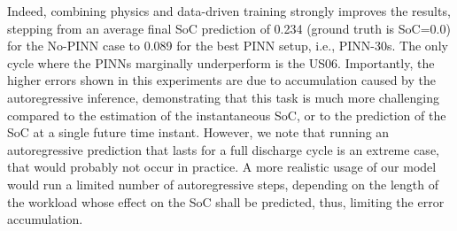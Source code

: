Indeed, combining physics and data-driven training strongly improves the results, stepping from an average final SoC prediction of 0.234 (ground truth is SoC=0.0) for the No-PINN case to 0.089 for the best PINN setup, i.e., PINN-30s. 
The only cycle where the PINNs marginally underperform is the US06.
Importantly, the higher errors shown in this experiments are due to accumulation caused by the autoregressive inference,
demonstrating that this task is much more challenging compared to the estimation of the instantaneous SoC, or to the prediction of the SoC at a single future time instant.
%
However, we note that running an autoregressive prediction that lasts for a full discharge cycle is an extreme case, that would probably not occur in practice. A more realistic usage of our model would run a limited number of autoregressive steps, depending on the length of the workload whose effect on the SoC shall be predicted, thus, limiting the error accumulation.

